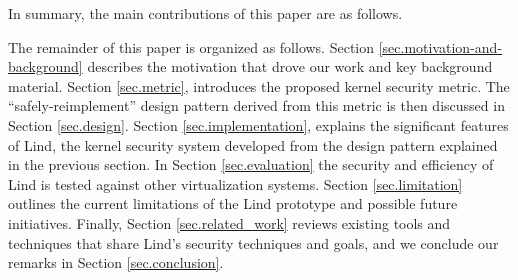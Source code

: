 In summary,
the main contributions of this paper are as follows. %

The remainder of this paper is organized as follows.
Section \ref{sec.motivation-and-background} describes the motivation that drove our work and key background material.
Section \ref{sec.metric}, introduces the proposed kernel security metric. The
``safely-reimplement'' design pattern derived from this metric is then discussed in Section \ref{sec.design}. Section \ref{sec.implementation},
explains the significant features of Lind, the kernel security system developed
from the design pattern explained in the previous section. In Section \ref{sec.evaluation} the security and
efficiency of Lind is tested against other virtualization systems.
Section \ref{sec.limitation} outlines the current
limitations of the Lind prototype and possible future initiatives.
Finally, Section \ref{sec.related_work} reviews existing tools and techniques that share
Lind's security techniques and goals, and we conclude our remarks in
Section \ref{sec.conclusion}.
